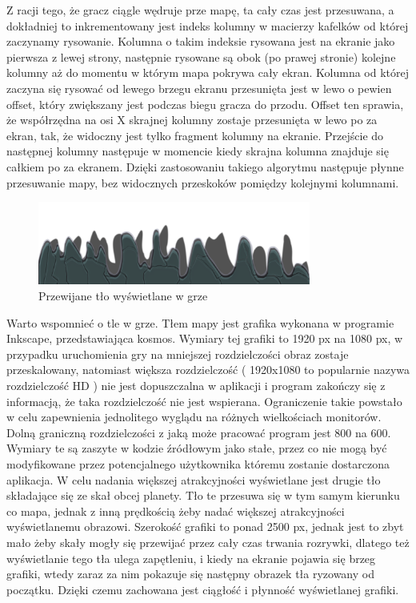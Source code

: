 Z racji tego, że gracz ciągle wędruje prze mapę, ta cały czas jest przesuwana, a dokładniej  to inkrementowany jest indeks kolumny w macierzy kafelków od której zaczynamy rysowanie. Kolumna o takim indeksie rysowana jest na ekranie jako pierwsza z lewej strony, następnie rysowane są obok (po prawej stronie) kolejne kolumny aż do momentu w którym mapa pokrywa cały ekran.
Kolumna od której zaczyna się rysować od lewego brzegu ekranu przesunięta jest w lewo o pewien offset, który zwiększany jest podczas biegu gracza do przodu. Offset ten sprawia, że współrzędna na osi X skrajnej kolumny zostaje przesunięta w lewo po za ekran, tak, że widoczny jest tylko fragment kolumny na ekranie. Przejście do następnej kolumny następuje w momencie kiedy skrajna kolumna znajduje się całkiem po za ekranem. Dzięki zastosowaniu takiego algorytmu następuje płynne przesuwanie mapy, bez widocznych przeskoków pomiędzy kolejnymi kolumnami.

\begin{figure}[h]
    \centering
    \includegraphics[width=0.8\textwidth,natwidth=800,natheight=160]{./Pictures/back.png}
    \caption{Przewijane tło wyświetlane w grze}
\end{figure}

Warto wspomnieć o tle w grze. Tłem mapy jest grafika wykonana w programie Inkscape, przedstawiająca kosmos. Wymiary tej grafiki to 1920 px na 1080 px, w przypadku uruchomienia gry na mniejszej rozdzielczości obraz zostaje przeskalowany, natomiast większa rozdzielczość ( 1920x1080 to popularnie nazywa rozdzielczość HD ) nie jest dopuszczalna w aplikacji i program zakończy się z informacją, że taka rozdzielczość nie jest wspierana. Ograniczenie takie powstało w celu zapewnienia jednolitego wyglądu na różnych wielkościach monitorów. Dolną graniczną rozdzielczości z jaką może pracować program jest 800 na 600. Wymiary te są zaszyte w kodzie źródłowym jako stałe, przez co nie mogą być modyfikowane przez potencjalnego użytkownika któremu zostanie dostarczona aplikacja. W celu nadania większej atrakcyjności wyświetlane jest drugie tło składające się ze skał obcej planety. 
Tło te przesuwa się w tym samym kierunku co mapa, jednak z inną prędkością żeby nadać
większej atrakcyjności wyświetlanemu obrazowi. Szerokość grafiki to ponad 2500 px, jednak jest to zbyt mało żeby skały mogły się przewijać przez cały czas trwania rozrywki, dlatego też wyświetlanie tego tła ulega zapętleniu, i kiedy na ekranie pojawia się brzeg grafiki, wtedy zaraz za nim pokazuje się następny obrazek tła ryzowany od początku. Dzięki czemu zachowana jest ciągłość i płynność wyświetlanej grafiki. 
 


